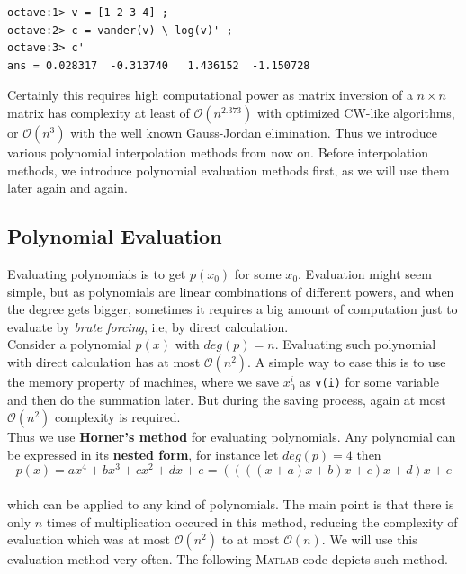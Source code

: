 \documentclass[paper=a4, fontsize=11pt]{scrartcl}
\newcommand{\MATLAB}{\textsc{Matlab}\xspace}
\begin{document}
\begin{verbatim}
octave:1> v = [1 2 3 4] ;
octave:2> c = vander(v) \ log(v)' ;
octave:3> c'
ans = 0.028317  -0.313740   1.436152  -1.150728
\end{verbatim}

Certainly this requires high computational power as matrix inversion of a $n \times n$ matrix has complexity at least of $\mathcal{O}(n^{2.373})$ with optimized CW-like algorithms, or $\mathcal{O}(n^3)$ with the well known Gauss-Jordan elimination. Thus we introduce various polynomial interpolation methods from now on. Before interpolation methods, we introduce polynomial evaluation methods first, as we will use them later again and again.
\vspace{0.15in}
\subsection{Polynomial Evaluation}
\vspace{0.15in}
Evaluating polynomials is to get $p(x_0)$ for some $x_0$. Evaluation might seem simple, but as polynomials are linear combinations of different powers, and when the degree gets bigger, sometimes it requires a big amount of computation just to evaluate by \textit{brute forcing}, i.e, by direct calculation. \\

Consider a polynomial $p(x)$ with $deg(p)=n$. Evaluating such polynomial with direct calculation has at most $\mathcal{O}(n^2)$. A simple way to ease this is to use the memory property of machines, where we save $x_0^i$ as \texttt{v(i)} for some variable and then do the summation later. But during the saving process, again at most $\mathcal{O}(n^2)$ complexity is required.\\

 Thus we use \textbf{Horner's method} for evaluating polynomials. Any polynomial can be expressed in its \textbf{nested form}, for instance let $deg(p)=4$ then \\
 
 \begin{equation}\nonumber
 	p(x) = ax^4 + bx^3 + cx^2 + dx +e = \left( \left(\left(\left(x+a\right)x+b\right)x+c\right)x +d\right)x + e
 \end{equation}\\
 
 which can be applied to any kind of polynomials. The main point is that there is only $n$ times of multiplication occured in this method, reducing the complexity of evaluation which was at most $\mathcal{O}(n^2)$ to at most $\mathcal{O}(n)$. We will use this evaluation method very often. The following \MATLAB code depicts such method.\\
\end{document}

